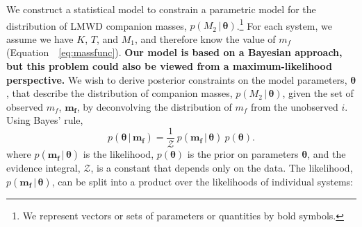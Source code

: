 \documentclass[apjl]{emulateapj}
\newcommand{\given}{\,|\,}
\newcommand{\bs}[1]{\boldsymbol{#1}}
\newcommand{\eqn}{Equation~}
\newcommand{\mf}{m_f}
\begin{document}
We construct a statistical model to constrain a parametric model for the distribution of LMWD companion masses, $p(M_2 \given \bs{\theta})$.\footnote{We represent vectors or sets of parameters or quantities by bold symbols.} For each system, we assume we have $K$, $T$, and $M_1$, and therefore know the value of $\mf$ (\eqn~\ref{eq:massfunc}). {\bf Our model is based on a Bayesian approach, but this problem could also be viewed from a maximum-likelihood perspective.} We wish to derive posterior constraints on the model parameters, $\bs{\theta}$, that describe the distribution of companion masses, $p(M_2\given \bs{\theta})$, given the set of observed $\mf$, $\bs{m_f}$, by deconvolving the distribution of $\mf$ from the unobserved $i$. Using Bayes' rule,
\begin{equation}
    p(\bs{\theta} \given \bs{\mf}) = \frac{1}{\mathcal{Z}}~p(\bs{\mf} \given \bs{\theta})~p(\bs{\theta}).
\end{equation}
where $p(\bs{\mf} \given \bs{\theta})$ is the likelihood, $p(\bs{\theta})$ is the prior on parameters $\bs{\theta}$, and the evidence integral, $\mathcal{Z}$, is a constant that depends only on the data. The likelihood, $p(\bs{\mf} \given \bs{\theta})$, can be split into a product over the likelihoods of individual systems:
\end{document}

